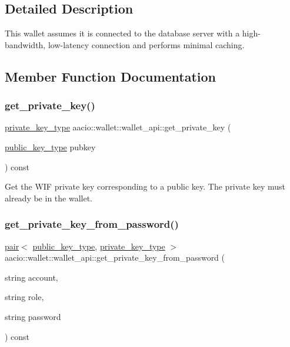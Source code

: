 \subsection{Detailed Description}
This wallet assumes it is connected to the database server with a high-\/bandwidth, low-\/latency connection and performs minimal caching. 

\subsection{Member Function Documentation}
\mbox{\label{classaacio_1_1wallet_1_1wallet__api_ad9da1f4d4f7af4b2c5e153b89328f5f0}} 
\subsubsection{\texorpdfstring{get\+\_\+private\+\_\+key()}{get\_private\_key()}}
{\footnotesize\ttfamily \mbox{\hyperlink{classfc_1_1crypto_1_1private__key}{private\+\_\+key\+\_\+type}} aacio\+::wallet\+::wallet\+\_\+api\+::get\+\_\+private\+\_\+key (\begin{DoxyParamCaption}\item[{\mbox{\hyperlink{classfc_1_1crypto_1_1public__key}{public\+\_\+key\+\_\+type}}}]{pubkey }\end{DoxyParamCaption}) const}

Get the W\+IF private key corresponding to a public key. The private key must already be in the wallet. \mbox{\label{classaacio_1_1wallet_1_1wallet__api_a5d8d935bdae2e2d77073899f6c0f51e7}} 
\subsubsection{\texorpdfstring{get\+\_\+private\+\_\+key\+\_\+from\+\_\+password()}{get\_private\_key\_from\_password()}}
{\footnotesize\ttfamily \mbox{\hyperlink{structpair}{pair}}$<$ \mbox{\hyperlink{classfc_1_1crypto_1_1public__key}{public\+\_\+key\+\_\+type}}, \mbox{\hyperlink{classfc_1_1crypto_1_1private__key}{private\+\_\+key\+\_\+type}} $>$ aacio\+::wallet\+::wallet\+\_\+api\+::get\+\_\+private\+\_\+key\+\_\+from\+\_\+password (\begin{DoxyParamCaption}\item[{string}]{account,  }\item[{string}]{role,  }\item[{string}]{password }\end{DoxyParamCaption}) const}


